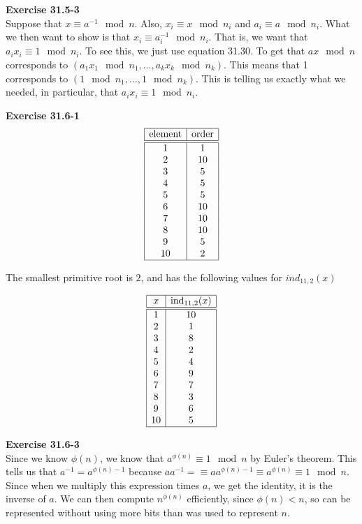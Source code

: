 \documentclass{article}
\begin{document}
\noindent\textbf{Exercise 31.5-3}\\

Suppose that $x \equiv a^{-1} \mod n$. Also, $x_i \equiv  x\mod n_i$ and $a_i \equiv a \mod n_i$. What we then want to show is that $x_i \equiv a_i^{-1} \mod n_i$. That is, we want that $a_ix_i \equiv 1 \mod n_i$. To see this, we just use equation 31.30. To get that $ax\mod n$ corresponds to $(a_1x_1 \mod n_1, \ldots, a_kx_k \mod n_k)$. This means that 1 corresponds to $( 1\mod n_1, \ldots, 1\mod n_k)$. This is telling us exactly what we needed, in particular, that $a_i x_i \equiv 1 \mod n_i$.



\noindent\textbf{Exercise 31.6-1}\\

\[
\begin{array}{|c|c|}
\hline
\hbox{element}&\hbox{order}\\
\hline
\hline
1&1\\
2& 10\\
3& 5\\
4& 5\\
5& 5\\
6& 10\\
7& 10\\
8& 10\\
9& 5\\
10& 2\\
\hline
\end{array}
\]

The smallest primitive root is $2$, and has the following values for $ind_{11,2}(x)$

\[
\begin{array}{|c|c|}
\hline
x&\hbox{ind}_{11,2}(x)\\
\hline
\hline
1& 10\\
2& 1\\
3& 8\\
4& 2\\
5& 4\\
6& 9\\
7& 7\\
8& 3\\
9& 6\\
10&5 \\
\hline
\end{array}
\]



\noindent\textbf{Exercise 31.6-3}\\

Since we know $\phi(n)$, we know that $a^{\phi(n)} \equiv 1 \mod n$ by Euler's theorem. This tells us that $a^{-1} = a^{\phi(n) - 1}$ because $aa^{-1} =\equiv a a^{\phi(n) -1} \equiv a^{\phi(n)} \equiv 1 \mod n$. Since when we multiply this expression times $a$, we get the identity, it is the inverse of $a$. We can then compute $n^{\phi(n)}$ efficiently, since $\phi(n) < n$, so can be represented without using more bits than was used to represent $n$.\\
\end{document}
